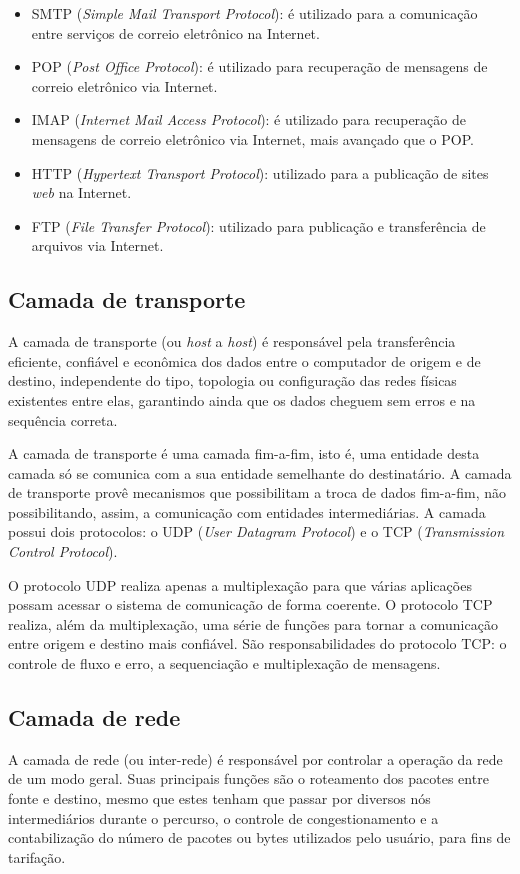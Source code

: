 \begin{itemize}
	\item SMTP (\textit{Simple Mail Transport Protocol}): é utilizado para a 
	comunicação entre serviços de correio eletrônico na Internet.
	\item POP (\textit{Post Office Protocol}): é utilizado para recuperação de 
	mensagens de correio eletrônico via Internet.
	\item IMAP (\textit{Internet Mail Access Protocol}): é utilizado para 
	recuperação de mensagens de correio eletrônico via Internet, mais 
	avançado que o POP.
	\item HTTP (\textit{Hypertext Transport Protocol}): utilizado para a 
	publicação de sites \textit{web} na Internet.
	\item FTP (\textit{File Transfer Protocol}): utilizado para publicação e 
	transferência de arquivos via Internet.

\end{itemize}

\subsection{Camada de transporte}

A camada de transporte (ou \textit{host} a \textit{host}) é responsável pela 
transferência eficiente, confiável e econômica dos dados entre o computador de 
origem e de destino, independente do tipo, topologia ou configuração das redes 
físicas existentes entre elas, garantindo ainda que os dados cheguem sem erros 
e na sequência correta.

A camada de transporte é uma camada fim-a-fim, isto é, uma entidade desta 
camada só se comunica com a sua entidade semelhante do destinatário. A camada 
de transporte provê mecanismos que possibilitam a troca de dados fim-a-fim, não 
possibilitando, assim, a comunicação com entidades intermediárias. A camada 
possui dois protocolos: o UDP (\textit{User Datagram Protocol}) e o TCP 
(\textit{Transmission Control Protocol}).

O protocolo UDP realiza apenas a multiplexação para que várias aplicações 
possam acessar o sistema de comunicação de forma coerente. O protocolo TCP 
realiza, além da multiplexação, uma série de funções para 
tornar a comunicação entre origem e destino mais confiável. São 
responsabilidades do protocolo TCP: o controle de fluxo e erro, a 
sequenciação e multiplexação de mensagens.

\subsection{Camada de rede}
A camada de rede (ou inter-rede) é responsável por controlar a operação da rede 
de um modo geral. Suas principais funções são o roteamento dos pacotes entre 
fonte e destino, mesmo que estes tenham que passar por diversos nós 
intermediários durante o percurso, o controle de congestionamento e a 
contabilização do número de pacotes ou bytes utilizados pelo usuário, para fins 
de tarifação.

